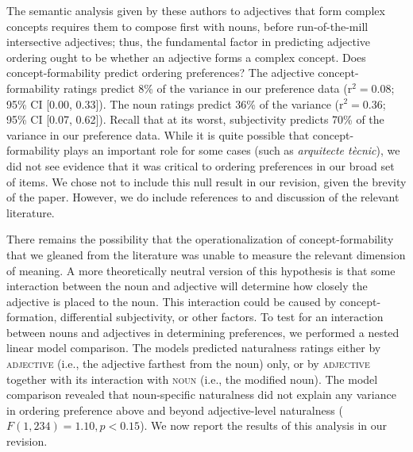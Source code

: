 \documentclass[12pt]{article}
\begin{document}
The semantic analysis given by these authors to adjectives that form complex concepts requires them to compose first with nouns, before run-of-the-mill intersective adjectives; thus, the fundamental factor in predicting adjective ordering ought to be whether an adjective forms a complex concept. Does concept-formability predict ordering preferences?
The adjective concept-formability ratings predict 8\% of the variance in our preference data (r$^{2}=0.08$; 95\% CI [0.00,  0.33]). The noun ratings predict 36\% of the variance (r$^{2}=0.36$; 95\% CI [0.07,  0.62]). Recall that at its worst, subjectivity predicts 70\% of the variance in our preference data.
While it is quite possible that concept-formability plays an important role for some cases (such as \emph{arquitecte t\`{e}cnic}), we did not see evidence that it was critical to ordering preferences in our broad set of items. We chose not to include this null result in our revision, given the brevity of the paper. 
However, we do include references to and discussion of the relevant literature. 

There remains the possibility that the operationalization of concept-formability that we gleaned from the literature was unable to measure the relevant dimension of meaning. A more theoretically neutral version of this hypothesis is that some interaction between the noun and adjective will determine how closely the adjective is placed to the noun. This interaction could be caused by concept-formation, differential subjectivity, or other factors. To test for an interaction between nouns and adjectives in determining preferences, we performed a nested linear model comparison. The models predicted naturalness ratings either by \textsc{adjective} (i.e., the adjective farthest from the noun) only, or by \textsc{adjective} together with its interaction with \textsc{noun} (i.e., the modified noun).	The model comparison revealed  that noun-specific naturalness did not explain any variance in ordering preference above and beyond adjective-level naturalness ($F(1,234) = 1.10, p < 0.15$). We now report the results of this analysis in our revision.
\end{document}
